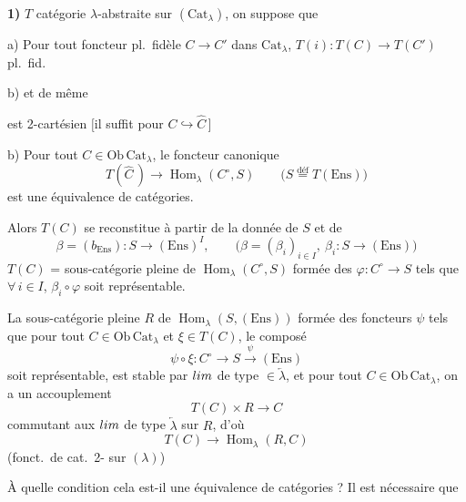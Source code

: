 \documentclass[11pt,a4paper]{article}
\begin{document}
\textbf{1)} $T$ catégorie $\lambda$-abstraite sur $(\mathrm{Cat}_{\lambda})$, on
suppose que 

a) Pour tout foncteur pl.\ fidèle  $C \to C'$ dans
$\mathrm{Cat}_{\lambda}$, $T(i) : T(C) \to T(C')$ pl.\ fid.

b) et de même
est 2-cartésien $[$il \ill{} suffit pour $C \hookrightarrow \widehat{C}\,]$


b) Pour tout $C \in \mathrm{Ob}\,\mathrm{Cat}_{\lambda}$, le foncteur canonique
\[
T(\widehat{C}\,) \longrightarrow \operatorname{Hom}_{\lambda}(C^{\circ}, S)
\qquad \bigl( S \overset{\text{déf}}{=} T(\mathrm{Ens}) \bigr)
\]
est une équivalence de catégories.

Alors $T(C)$ se reconstitue à partir de la donnée de $S$ et de
\[
\beta = (b_{\mathrm{Ens}}) : S \longrightarrow (\mathrm{Ens})^{I},
\qquad \bigl( \beta = (\beta_{i})_{i \in I},\ \beta_{i} : S \to (\mathrm{Ens})
\bigr)
\]
$T(C)$ = sous-catégorie pleine de $\operatorname{Hom}_{\lambda}(C^{\circ}, S)$
formée des $\varphi : C^{\circ} \to S$ tels que $\forall\, i \in I$,
$\beta_{i} \circ \varphi$ soit représentable.


\struck{\ill{}} La sous-catégorie pleine $R$ de $\operatorname{Hom}_{\lambda}(S,
(\mathrm{Ens}))$ formée des foncteurs $\psi$ tels que pour tout $C \in
\mathrm{Ob}\,\mathrm{Cat}_{\lambda}$ et $\xi \in T(C)$, le composé
\[
\psi \circ \xi : C^{\circ} \longrightarrow S \xrightarrow{\ \psi\ }
(\mathrm{Ens})
\]
soit représentable, est stable par $\varprojlim$ de type $\in
\underleftarrow{\lambda}$,  et pour tout
$C \in \mathrm{Ob}\,\mathrm{Cat}_{\lambda}$, on a un accouplement
\[
T(C) \times R \longrightarrow C
\]
commutant aux $\varprojlim$ de type $\underleftarrow{\lambda}$ sur $R$, d'où
\[
T(C) \longrightarrow \operatorname{Hom}_{\lambda}(R, C)
\]
(fonct.\ de cat.\ 2-\ill{} sur $(\lambda)$)

À quelle condition cela est-il une équivalence de catégories ? Il est nécessaire
que
\end{document}
